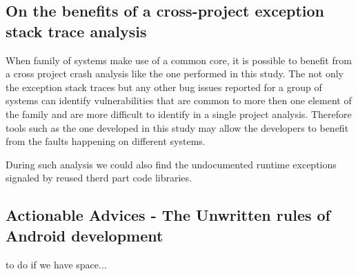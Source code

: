 \documentclass[conference]{IEEEtran}
\begin{document}

\subsection{On the benefits of a cross-project exception stack trace analysis}  

When family of systems make use of a common core, it is possible to benefit from a cross project crash analysis like the one performed in this study.
 The not only the exception stack traces but any other bug issues reported for a group of systems can identify vulnerabilities 
that are common to more then one element of the family and are more difficult to identify in a single project analysis.
Therefore tools such as the one developed in this study may allow the developers to 
benefit from the faults happening on different systems.  



During such analysis we could also find the undocumented runtime exceptions 
signaled by reused therd part code libraries. 



\subsection{Actionable Advices - The Unwritten rules of Android development}
to do if we have space...
\end{document}
